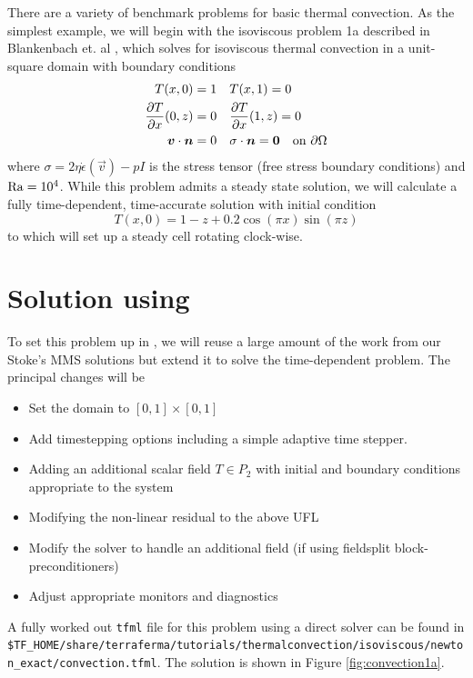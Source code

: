 There are a variety of benchmark problems for basic thermal
convection. As the simplest example, we will begin with the isoviscous
problem 1a described in Blankenbach et. al
\cite{blankenbach_benchmark_1989}, which solves for isoviscous thermal
convection in a unit-square domain with boundary conditions
\begin{align}
  \label{eq:rbconvBCs}
  T(x,0) = 1 &  \quad T(x,1) = 0\\
  \frac{\partial T}{\partial x}(0,z)=0 &  \quad\frac{\partial T}{\partial x}(1,z)=0\\
  {\mbox{\boldmath$v$}}\cdot{\mbox{\boldmath$n$}} = 0 & \quad \sigma\cdot{\mbox{\boldmath$n$}}= {\mbox{\boldmath$0$}} \quad\text{on } \partial\Omega 
\end{align}
where $\sigma = 2\eta \dot{\epsilon}(\vec{v})-pI$ is the stress tensor
(free stress boundary conditions) %
and $\mathrm{Ra}=10^{4}$.  While this problem admits a steady state solution,
we will calculate a fully time-dependent, time-accurate solution with
initial condition
\begin{displaymath}
  T(x,0) = 1 - z + 0.2\cos(\pi x)\sin(\pi z)
\end{displaymath}
to which will set up a steady cell rotating clock-wise.
\pagebreak{}
\section{Solution using \TF}
\label{sec:solution-using-tf}

To set this problem up in \TF{}, we will reuse a large amount of the
work from our Stoke's MMS solutions but extend it to solve the
time-dependent problem.  The principal changes will be
\begin{itemize}
\setlength{\itemsep}{-.1em}
\item Set the domain to  $[0,1]\times[0,1]$ 
\item Add timestepping options including a simple adaptive time stepper.
\item Adding an additional scalar field $T\in P_{2}$ with initial and
  boundary conditions appropriate  to the system
\item Modifying the non-linear residual to the above UFL
\item Modify the solver to handle an additional field (if using
  fieldsplit block-preconditioners)
\item Adjust appropriate monitors and diagnostics
\end{itemize}

A fully worked out \texttt{tfml} file for this problem using a direct
solver %
can be found in
\texttt{\$TF\_HOME/share/terraferma/tutorials/thermalconvection/isoviscous/newton\_exact/convection.tfml}.  The
solution is shown in Figure \ref{fig:convection1a}.   


